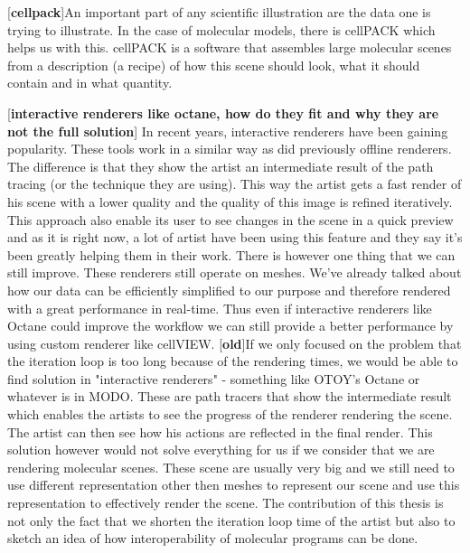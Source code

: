 \documentclass[
  digital, %
  table,   %
  nolof,     %
  nolot,     %
]{fithesis3}
\begin{document}
[\textbf{cellpack}]An important part of any scientific illustration are the data one is trying to illustrate. In the case of molecular models, there is cellPACK which helps us with this. cellPACK is a software that assembles large molecular scenes from a description (a recipe) of how this scene should look, what it should contain and in what quantity.

[\textbf{interactive renderers like octane, how do they fit and why they are not the full solution}]
In recent years, interactive renderers have been gaining popularity. These tools work in a similar way as did previously offline renderers. The difference is that they show the artist an intermediate result of the path tracing (or the technique they are using). This way the artist gets a fast render of his scene with a lower quality and the quality of this image is refined iteratively. This approach also enable its user to see changes in the scene in a quick preview and as it is right now, a lot of artist have been using this feature and they say it's been greatly helping them in their work. There is however one thing that we can still improve. These renderers still operate on meshes. We've already talked about how our data can be efficiently simplified to our purpose and therefore rendered with a great performance in real-time. Thus even if interactive renderers like Octane could improve the workflow we can still provide a better performance by using custom renderer like cellVIEW.
[\textbf{old}]If we only focused on the problem that the iteration loop is too long because of the rendering times, we would be able to find solution in "interactive renderers" - something like OTOY's Octane or whatever is in MODO. These are path tracers that show the intermediate result which enables the artists to see the progress of the renderer rendering the scene. The artist can then see how his actions are reflected in the final render. This solution however would not solve everything for us if we consider that we are rendering molecular scenes. These scene are usually very big and we still need to use different representation other then meshes to represent our scene and use this representation to effectively render the scene. The contribution of this thesis is not only the fact that we shorten the iteration loop time of the artist but also to sketch an idea of how interoperability of molecular programs can be done.
\end{document}
